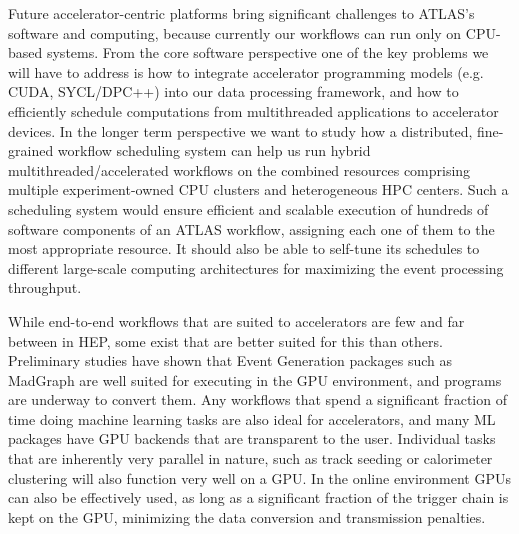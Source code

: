 Future accelerator-centric platforms bring significant challenges to ATLAS's software and computing, because currently our workflows can run only on CPU-based systems. From the core software perspective one of the key problems we will have to address is how to integrate accelerator programming models (e.g. CUDA, SYCL/DPC++) into our data processing framework, and how to efficiently schedule computations from multithreaded applications to accelerator devices. In the longer term perspective we want to study how a distributed, fine-grained workflow scheduling system can help us run hybrid multithreaded/accelerated workflows on the combined resources comprising multiple experiment-owned CPU clusters and heterogeneous HPC centers. Such a scheduling system would ensure efficient and scalable execution of hundreds of software components of an ATLAS workflow, assigning each one of them to the most appropriate resource. It should also be able to self-tune its schedules to different large-scale computing architectures for maximizing the event processing throughput.

While end-to-end workflows that are suited to accelerators are few and far between in HEP, some exist that are better suited for this than others. Preliminary studies \cite{madgraph} have shown that Event Generation packages such as MadGraph are well suited for executing in the GPU environment, and programs are underway to convert them. Any workflows that spend a significant fraction of time doing machine learning tasks are also ideal for accelerators, and many ML packages have GPU backends that are transparent to the user. Individual tasks that are inherently very parallel in nature, such as track seeding or calorimeter clustering will also function very well on a GPU. In the online environment GPUs can also be effectively used, as long as a significant fraction of the trigger chain is kept on the GPU, minimizing the data conversion and transmission penalties.


